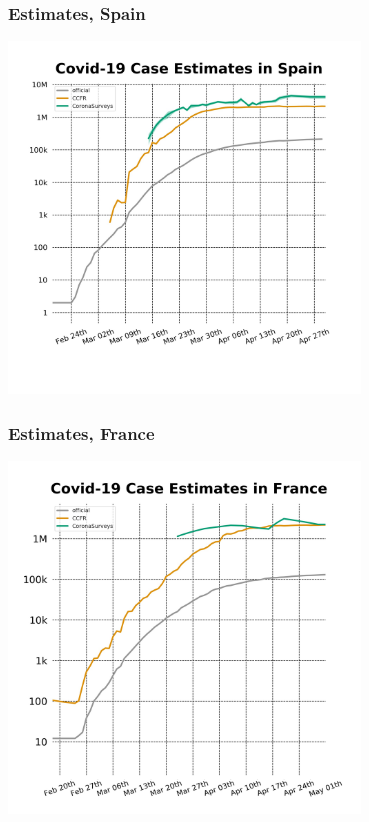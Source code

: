 \documentclass{beamer}
\begin{document}
\begin{frame}
  \frametitle{Estimates, Spain}
  \begin{center}
  \includegraphics[width=0.7\textwidth]{estimatesES.jpg}
  \end{center}
\end{frame}

\begin{frame}
  \frametitle{Estimates, France}
  \begin{center}
  \includegraphics[width=0.7\textwidth]{estimatesFR.jpg}
  \end{center}
\end{frame}
\end{document}
